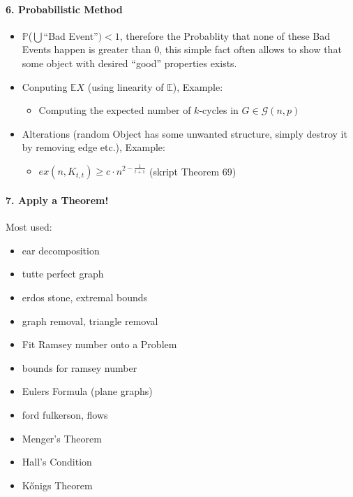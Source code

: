 \documentclass[a4paper]{article}
\begin{document}
\paragraph{6. Probabilistic Method}
\begin{itemize}
    \item $\mathbb{P}$($\bigcup$\enquote{Bad Event}$) < 1$, therefore the Probablity 
    that none of these Bad Events happen is greater than 0, this simple fact often
    allows to show that some object with desired \enquote{good} properties exists.

    \item Conputing $ \mathbb{E} X$ (using linearity of $\mathbb{E}$), Example: 
        \begin{itemize}
            \item Computing the expected number of $k$-cycles in 
            $ G \in \mathcal{G}(n,p)$ 
        \end{itemize}

    \item Alterations (random Object has some unwanted structure, simply destroy it 
    by removing edge etc.), Example:
        \begin{itemize}
            \item $ ex(n,K_{t,t}) \geq c\cdot n^{2 - \frac{1}{t+1}} $ (skript Theorem 69)
        \end{itemize}
\end{itemize}

\paragraph{7. Apply a Theorem!}  $ $ \\ 
Most used:
    \begin{itemize}
        \item ear decomposition
        \item tutte perfect graph
        \item erdos stone, extremal bounds 
        \item graph removal, triangle removal
        \item Fit Ramsey number onto a Problem
        \item bounds for ramsey number
        \item Eulers Formula (plane graphs)
        \item ford fulkerson, flows
        \item Menger's Theorem 
        \item Hall's Condition 
        \item K\H{o}nigs Theorem
    \end{itemize}
\end{document}
